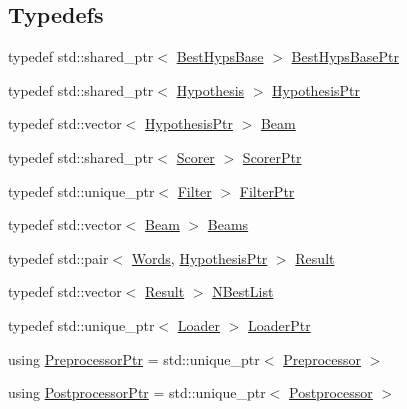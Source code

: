 \subsection*{Typedefs}
\begin{DoxyCompactItemize}
\item 
typedef std\+::shared\+\_\+ptr$<$ \hyperlink{classamunmt_1_1BestHypsBase}{Best\+Hyps\+Base} $>$ \hyperlink{namespaceamunmt_a4a9522da34de52554ec07cedc30361b8}{Best\+Hyps\+Base\+Ptr}
\item 
typedef std\+::shared\+\_\+ptr$<$ \hyperlink{classamunmt_1_1Hypothesis}{Hypothesis} $>$ \hyperlink{namespaceamunmt_a9dd9d255e51649b0af19d0e895d52d2f}{Hypothesis\+Ptr}
\item 
typedef std\+::vector$<$ \hyperlink{namespaceamunmt_a9dd9d255e51649b0af19d0e895d52d2f}{Hypothesis\+Ptr} $>$ \hyperlink{namespaceamunmt_a534a3a9a1d99c01a5adf05e700a26012}{Beam}
\item 
typedef std\+::shared\+\_\+ptr$<$ \hyperlink{classamunmt_1_1Scorer}{Scorer} $>$ \hyperlink{namespaceamunmt_a703e88438d533fef1db5cc95060b36f0}{Scorer\+Ptr}
\item 
typedef std\+::unique\+\_\+ptr$<$ \hyperlink{classamunmt_1_1Filter}{Filter} $>$ \hyperlink{namespaceamunmt_a03c308343fcd4b59ebe53d562257e483}{Filter\+Ptr}
\item 
typedef std\+::vector$<$ \hyperlink{namespaceamunmt_a534a3a9a1d99c01a5adf05e700a26012}{Beam} $>$ \hyperlink{namespaceamunmt_a90a1b353bc62cb90bc8e8da7edc3edc0}{Beams}
\item 
typedef std\+::pair$<$ \hyperlink{namespaceamunmt_aa50d0b3a5ba58ba5da8a4d88ddab1b18}{Words}, \hyperlink{namespaceamunmt_a9dd9d255e51649b0af19d0e895d52d2f}{Hypothesis\+Ptr} $>$ \hyperlink{namespaceamunmt_af12bd731cf50f363bdcbec0f435bafb1}{Result}
\item 
typedef std\+::vector$<$ \hyperlink{namespaceamunmt_af12bd731cf50f363bdcbec0f435bafb1}{Result} $>$ \hyperlink{namespaceamunmt_a4ad8f6c25b18c8675040456c6e95e0f6}{N\+Best\+List}
\item 
typedef std\+::unique\+\_\+ptr$<$ \hyperlink{classamunmt_1_1Loader}{Loader} $>$ \hyperlink{namespaceamunmt_a7907c3626488deed31e31452d178d78e}{Loader\+Ptr}
\item 
using \hyperlink{namespaceamunmt_a01f8e038a68167c344d9e40146064712}{Preprocessor\+Ptr} = std\+::unique\+\_\+ptr$<$ \hyperlink{classamunmt_1_1Preprocessor}{Preprocessor} $>$
\item 
using \hyperlink{namespaceamunmt_a93da118427da6be237f0407643816798}{Postprocessor\+Ptr} = std\+::unique\+\_\+ptr$<$ \hyperlink{classamunmt_1_1Postprocessor}{Postprocessor} $>$

\end{DoxyCompactItemize}
